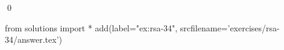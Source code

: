 
\begin{ex} 
  \label{ex:rsa-34}
  
  \qed
\end{ex} 
\begin{python0}
from solutions import *
add(label="ex:rsa-34",
    srcfilename='exercises/rsa-34/answer.tex') 
\end{python0}
